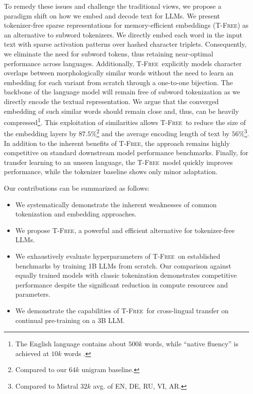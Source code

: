 \documentclass[11pt]{article}
\newcommand{\method}{\textsc{T-Free}}
\begin{document}
To remedy these issues and challenge the traditional views, we propose a paradigm shift on how we embed and decode text for LLMs. We present tokenizer-free sparse representations for memory-efficient embeddings (\method) as an alternative to subword tokenizers. We directly embed each word in the input text with sparse activation patterns over hashed character triplets. Consequently, we eliminate the need for subword tokens, thus retaining near-optimal performance across languages. 
Additionally, \method~explicitly models character overlaps between morphologically similar words without the need to learn an embedding for each variant from scratch through a one-to-one bijection. The backbone of the language model will remain free of subword tokenization as we directly encode the textual representation. 
We argue that the converged embedding of such similar words should remain close and, thus, can be heavily compressed\footnote{The English language contains about $500k$ words, while ``native fluency'' is achieved at $10k$ words \cite{nation2006large}.}.
This exploitation of similarities allows \method~to reduce the size of the embedding layers by $87.5\%$\footnote{Compared to our $64k$ unigram baseline.} and the average encoding length of text by $56\%$\footnote{Compared to Mistral $32k$ avg. of EN, DE, RU, VI, AR.}. In addition to the inherent benefits of \method, the approach remains highly competitive on standard downstream model performance benchmarks. 
Finally, for transfer learning to an unseen language, the \method\ model quickly improves performance, while the tokenizer baseline shows only minor adaptation.

Our contributions can be summarized as follows: 
\begin{itemize} 
    \item We systematically demonstrate the inherent weaknesses of common tokenization and embedding approaches. 
    \item We propose \method, a powerful and efficient alternative for tokenizer-free LLMs.
    \item We exhaustively evaluate hyperparameters of \method~on established benchmarks by training 1B LLMs from scratch. Our comparison against equally trained models with classic tokenization demonstrates competitive performance despite the significant reduction in compute resources and parameters.
    \item We demonstrate the capabilities of \method~for cross-lingual transfer on continual pre-training 
    on a 3B LLM. 
\end{itemize}
\end{document}
